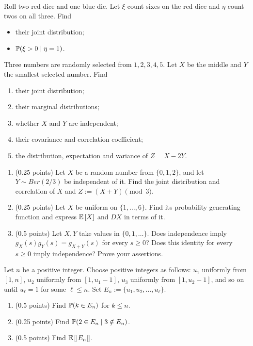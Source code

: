 \documentclass[a4paper]{report}
\begin{document}
\begin{problembook}
Roll two red dice and one blue die. Let $\xi$ count sixes on the red dice and $\eta$ count twos on all three. Find
\begin{itemize}\item their joint distribution;\item $\P(\xi>0\mid\eta=1)$.\end{itemize}
\end{problembook}
\begin{problembook}
Three numbers are randomly selected from $1,2,3,4,5$. Let $X$ be the middle and $Y$ the smallest selected number. Find
\begin{enumerate}
\item their joint distribution;
\item their marginal distributions;
\item whether $X$ and $Y$ are independent;
\item their covariance and correlation coefficient;
\item the distribution, expectation and variance of $Z=X-2Y$.
\end{enumerate}
\end{problembook}
\begin{problempencil}[T1, CS 2024]
\begin{enumerate}
\item (0.25 points) Let $X$ be a random number from $\{0,1,2\}$, and let $Y\sim Ber(2/3)$ be independent of it. Find the joint distribution and correlation of $X$ and $Z:=(X+Y)\pmod3$.
\item (0.25 points) Let $X$ be uniform on $\{1,\dots,6\}$. Find its probability generating function and express $\Ebb{X}$ and $DX$ in terms of it.
\item (0.5 points) Let $X,Y$ take values in $\{0,1,\dots\}$. Does independence imply $g_X(s)g_Y(s)=g_{X+Y}(s)$ for every $s\ge0$? Does this identity for every $s\ge0$ imply independence? Prove your assertions.
\end{enumerate}
\end{problempencil}
\begin{problembook}
Let $n$ be a positive integer. Choose positive integers as follows: $u_1$ uniformly from $[1,n]$, $u_2$ uniformly from $[1,u_1-1]$, $u_3$ uniformly from $[1,u_2-1]$, and so on until $u_\ell=1$ for some $\ell\le n$. Set $E_n:=\{u_1,u_2,\dots,u_\ell\}$.
\begin{enumerate}
\item (0.5 points) Find $\P(k\in E_n)$ for $k\le n$.
\item (0.25 points) Find $\P(2\in E_n\mid3\notin E_n)$.
\item (0.5 points) Find $\Ebb{|E_n|}$.
\end{enumerate}
\end{problembook}
\end{document}
